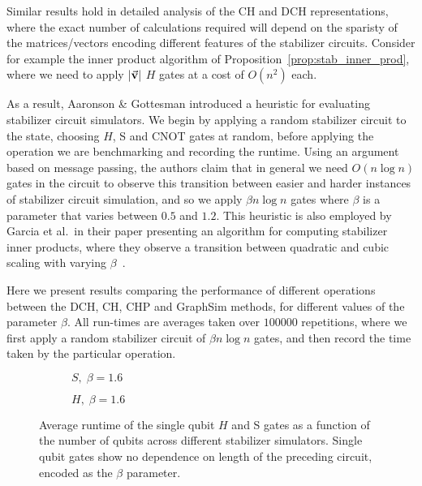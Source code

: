 Similar results hold in detailed analysis of the CH and DCH representations, where the exact number of calculations required will depend on the sparisty of the matrices/vectors encoding different features of the stabilizer circuits. Consider for example the inner product algorithm of Proposition~\ref{prop:stab_inner_prod}, where we need to apply $\vert \va{v}\vert$ $H$ gates at a cost of $O(n^{2})$ each.\par
As a result, Aaronson \& Gottesman introduced a heuristic for evaluating stabilizer circuit simulators. We begin by applying a random stabilizer circuit to the state, choosing $H$, S and CNOT gates at random, before applying the operation we are benchmarking and recording the runtime. Using an argument based on message passing, the authors claim that in general we need $O(n\log{n})$ gates in the circuit to observe this transition between easier and harder instances of stabilizer circuit simulation, and so we apply $\beta n\log{n}$ gates where $\beta$ is a parameter that varies between $0.5$ and $1.2$. This heuristic is also employed by Garcia et al.\ in their paper presenting an algorithm for computing stabilizer inner products, where they observe a transition between quadratic and cubic scaling with varying $\beta$~\cite{Garcia2012}.\par
Here we present results comparing the performance of different operations between the DCH, CH, CHP and GraphSim methods, for different values of the parameter $\beta$. All run-times are averages taken over $100000$ repetitions, where we first apply a random stabilizer circuit of $\beta n\log{n}$ gates, and then record the time taken by the particular operation.\par
\begin{figure}[p]
\centering
\begin{subfigure}[t]{0.48\textwidth}
    \centering
    \caption{$S,\;\beta=1.6$}
    \begin{scaletikzpicturetowidth}{\textwidth}
        
    \end{scaletikzpicturetowidth}
\end{subfigure}
\begin{subfigure}[t]{0.48\textwidth}
    \centering
    \caption{$H,\;\beta=1.6$}
    \begin{scaletikzpicturetowidth}{\textwidth}
        
    \end{scaletikzpicturetowidth}
\end{subfigure}
\caption{Average runtime of the single qubit $H$ and S gates as a function of the number of qubits across different stabilizer simulators. Single qubit gates show no dependence on length of the preceding circuit, encoded as the $\beta$ parameter.}
\label{fig:single_qubit_clifford_timings}
\end{figure}
